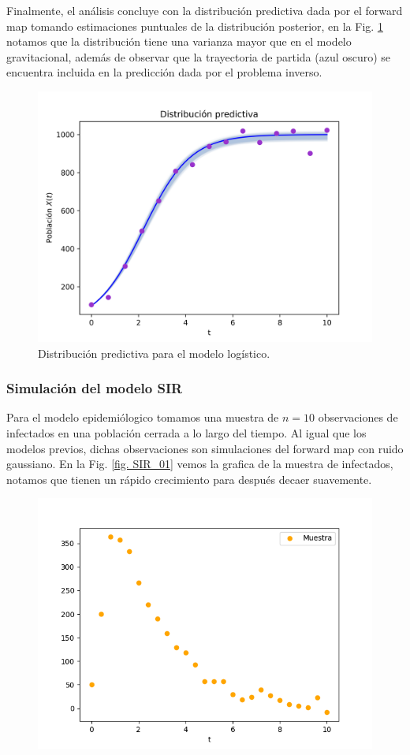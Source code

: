 Finalmente, el análisis concluye con la distribución predictiva dada por el forward map tomando estimaciones puntuales de la distribución posterior, en la Fig. \ref{Fig. 3.2.log.predictiva} notamos que la distribución tiene una varianza mayor que en el modelo gravitacional, además de observar que la trayectoria de partida (azul oscuro) se encuentra incluida en la predicción dada por el problema inverso.

\begin{figure}
    \centering 
    \includegraphics[width = 10 cm ]{img/Exp_Central_logistico_sigma/Figuras/Generales/Predictiva_logistico_sigma.png} 
    \caption{Distribución predictiva para el modelo logístico.}
    \label{Fig. 3.2.log.predictiva}
\end{figure} 

\subsubsection{Simulación del modelo SIR}

Para el modelo epidemiólogico tomamos una muestra de $n =10$ observaciones de infectados en una población cerrada a lo largo del tiempo. Al igual que los modelos previos, dichas observaciones son simulaciones del forward map con ruido gaussiano. En la Fig. \ref{fig. SIR_01} vemos la grafica de la muestra de infectados, notamos que tienen un rápido crecimiento para después decaer suavemente.

\begin{figure}[H] 
    \centering 
    \includegraphics[width = 10 cm]{img/Exp_Central_SIR_sigma/Figuras/Generales/Muestra_SIR_sigma.png} 
    \label{Fig. SIR_01}
\end{figure} 

